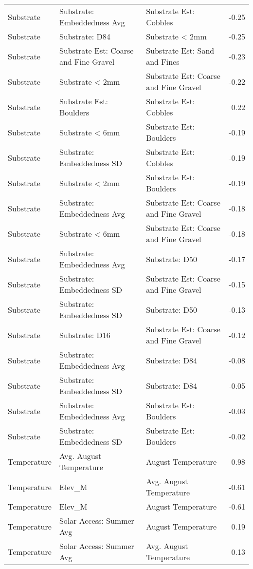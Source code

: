 \documentclass[
  12pt,
]{article}
\begin{document}
\begin{longtable}[t]{>{\raggedright\arraybackslash}p{1in}>{\raggedright\arraybackslash}p{2in}>{\raggedright\arraybackslash}p{2in}r}
Substrate & Substrate: Embeddedness Avg & Substrate Est: Cobbles & -0.25\\
Substrate & Substrate: D84 & Substrate < 2mm & -0.25\\
\addlinespace
Substrate & Substrate Est: Coarse and Fine Gravel & Substrate Est: Sand and Fines & -0.23\\
Substrate & Substrate < 2mm & Substrate Est: Coarse and Fine Gravel & -0.22\\
Substrate & Substrate Est: Boulders & Substrate Est: Cobbles & 0.22\\
Substrate & Substrate < 6mm & Substrate Est: Boulders & -0.19\\
Substrate & Substrate: Embeddedness SD & Substrate Est: Cobbles & -0.19\\
\addlinespace
Substrate & Substrate < 2mm & Substrate Est: Boulders & -0.19\\
Substrate & Substrate: Embeddedness Avg & Substrate Est: Coarse and Fine Gravel & -0.18\\
Substrate & Substrate < 6mm & Substrate Est: Coarse and Fine Gravel & -0.18\\
Substrate & Substrate: Embeddedness Avg & Substrate: D50 & -0.17\\
Substrate & Substrate: Embeddedness SD & Substrate Est: Coarse and Fine Gravel & -0.15\\
\addlinespace
Substrate & Substrate: Embeddedness SD & Substrate: D50 & -0.13\\
Substrate & Substrate: D16 & Substrate Est: Coarse and Fine Gravel & -0.12\\
Substrate & Substrate: Embeddedness Avg & Substrate: D84 & -0.08\\
Substrate & Substrate: Embeddedness SD & Substrate: D84 & -0.05\\
Substrate & Substrate: Embeddedness Avg & Substrate Est: Boulders & -0.03\\
\addlinespace
Substrate & Substrate: Embeddedness SD & Substrate Est: Boulders & -0.02\\
\hline
Temperature & Avg. August Temperature & August Temperature & 0.98\\
Temperature & Elev\_M & Avg. August Temperature & -0.61\\
Temperature & Elev\_M & August Temperature & -0.61\\
Temperature & Solar Access: Summer Avg & August Temperature & 0.19\\
\addlinespace
Temperature & Solar Access: Summer Avg & Avg. August Temperature & 0.13\\

\end{longtable}
\end{document}
